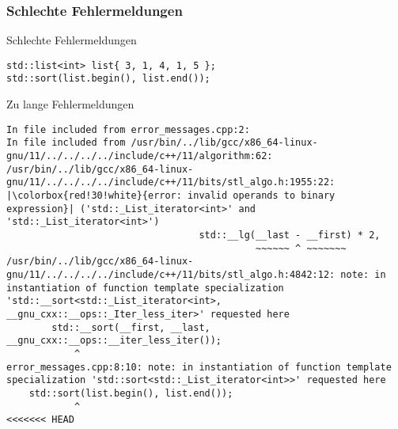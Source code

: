 \subsubsection{Schlechte Fehlermeldungen}

\begin{frame}[fragile]{Schlechte Fehlermeldungen}

    \begin{verbatim}
std::list<int> list{ 3, 1, 4, 1, 5 };
std::sort(list.begin(), list.end());
    \end{verbatim}
\end{frame}

\setlength{\fboxsep}{0.1pt}
\begin{frame}{Zu lange Fehlermeldungen}
    \begin{verbatim}
In file included from error_messages.cpp:2:
In file included from /usr/bin/../lib/gcc/x86_64-linux-gnu/11/../../../../include/c++/11/algorithm:62:
/usr/bin/../lib/gcc/x86_64-linux-gnu/11/../../../../include/c++/11/bits/stl_algo.h:1955:22:
|\colorbox{red!30!white}{error: invalid operands to binary expression}| ('std::_List_iterator<int>' and 'std::_List_iterator<int>')
                                  std::__lg(__last - __first) * 2,
                                            ~~~~~~ ^ ~~~~~~~
/usr/bin/../lib/gcc/x86_64-linux-gnu/11/../../../../include/c++/11/bits/stl_algo.h:4842:12: note: in instantiation of function template specialization 'std::__sort<std::_List_iterator<int>, __gnu_cxx::__ops::_Iter_less_iter>' requested here
        std::__sort(__first, __last, __gnu_cxx::__ops::__iter_less_iter());
            ^
error_messages.cpp:8:10: note: in instantiation of function template specialization 'std::sort<std::_List_iterator<int>>' requested here
    std::sort(list.begin(), list.end());
            ^
<<<<<<< HEAD


\end{verbatim}
\end{frame}

